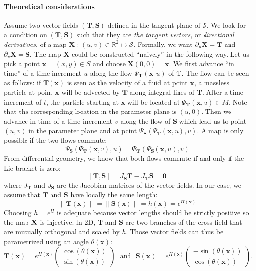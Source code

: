 \documentclass[AMA,STIX1COL]{WileyNJD-v2}
\newcommand{\vz}{\ensuremath{\mathbf{0}}}
\newcommand{\vx}{\ensuremath{\mathbf{x}}}
\newcommand{\vX}{{\ensuremath{\mathbf{T}}}}
\newcommand{\vY}{{\ensuremath{\mathbf{S}}}}
\newcommand{\vF}{\ensuremath{\mathbf{X}}}
\newcommand{\reals}{\ensuremath{\mathbb{R}}}
\newcommand{\surface}{\ensuremath{\mathcal{S}}}
\begin{document}
{\paragraph{Theoretical considerations}
Assume two vector fields $(\vX,\vY)$ 
defined in the tangent plane of $\surface$. We look for a condition on
$(\vX,\vY)$ such that they are \emph{the tangent vectors},
or \emph{directional derivatives}, of a map 
$\vF~:~(u,v) \in \reals^2 \mapsto \surface$. Formally, we want
$\partial_u \vF =  \vX$
and $\partial_v \vF =  \vY$.
The map $\vF$ could be constructed ``naively'' in the following
way. Let us pick a point $\vx = (x,y)\in S$
and choose $\vF (0,0) = \vx$. We first advance ``in time'' of a time increment $u$ along the flow 
$\Psi_{\vX}(\vx,u)$ of  $\vX$. The flow can be seen as follows: if $\vX(\vx)$ is seen as the velocity  
of a fluid at point $\vx$, a massless particle at point $\vx$ will be advected by $\vX$ along
integral lines of $\vX$. After a time increment of $t$, the particle starting at $\vx$ will be
located at $\Psi_{\vX} (\vx,u) \in M$. Note that the corresponding location in the 
parameter plane is $(u,0)$. 
Then we advance in time  of a time increment $v$ along the flow of 
$\vY$ which lead us to point $(u,v)$ in the parameter plane and at point 
$\Psi_{\vY} (\Psi_{\vX} (\vx,u),v)$. A map is only possible if the two flows commute:
\begin{equation}
\Psi_{\vY} (\Psi_{\vX} (\vx,v),u) = \Psi_{\vX} (\Psi_{\vY} (\vx,u),v)
\label{eq:flow}
\end{equation}
From differential geometry, we know that both flows commute if and only if  
the Lie bracket is zero:
$$[\vX,\vY] = J_\vY \vX -  J_\vX \vY = \vz$$
where $ J_\vX$ and $ J_\vY$ are the Jacobian matrices of the vector fields.
In our case, we assume that $\vX$ and $\vY$ have locally the same length: 
$$\|\vX(\vx)\| = \|\vY(\vx)\| = h(\vx) = e^{H(\vx)}$$
Choosing $h=e^H$ is adequate because vector lengths should be strictly
positive so the map ${\bf X}$ is injective.
In 2D, $\vX$ and $\vY$  are two branches of the cross
field that are mutually orthogonal and scaled by $h$. Those vector
fields can thus be parametrized using an angle $\theta(\vx)$:
\begin{equation}
\vX(\vx) = e^{H(\vx)} \begin{pmatrix} \cos(\theta(\vx)) \\ \sin(\theta(\vx)) \end{pmatrix}~~~\text{and}~~~ 
\vY(\vx) = e^{H(\vx)} \begin{pmatrix} -\sin(\theta(\vx)) \\ \cos(\theta(\vx)) \end{pmatrix}. 

\end{equation}}
\end{document}
